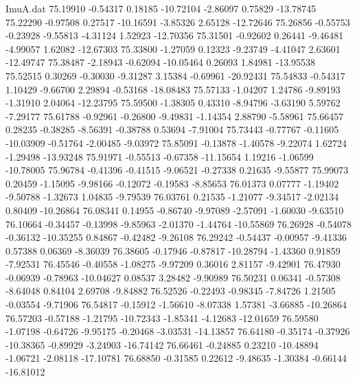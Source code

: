 \begin{filecontents}{ImuA.dat}
  75.19910   -0.54317    0.18185  -10.72104   -2.86097    0.75829  -13.78745
  75.22290   -0.97508    0.27517  -10.16591   -3.85326    2.65128  -12.72646
  75.26856   -0.55753   -0.23928   -9.55813   -4.31124    1.52923  -12.70356
  75.31501   -0.92602    0.26441   -9.46481   -4.99057    1.62082  -12.67303
  75.33800   -1.27059    0.12323   -9.23749   -4.41047    2.63601  -12.49747
  75.38487   -2.18943   -0.62094  -10.05464    0.26093    1.84981  -13.95538
  75.52515    0.30269   -0.30030   -9.31287    3.15384   -0.69961  -20.92431
  75.54833   -0.54317    1.10429   -9.66700    2.29894   -0.53168  -18.08483
  75.57133   -1.04207    1.24786   -9.89193   -1.31910    2.04064  -12.23795
  75.59500   -1.38305    0.43310   -8.94796   -3.63190    5.59762   -7.29177
  75.61788   -0.92961   -0.26800   -9.49831   -1.14354    2.88790   -5.58961
  75.66457    0.28235   -0.38285   -8.56391   -0.38788    0.53694   -7.91004
  75.73443   -0.77767   -0.11605  -10.03909   -0.51764   -2.00485   -9.03972
  75.85091   -0.13878   -1.40578   -9.22074    1.62724   -1.29498  -13.93248
  75.91971   -0.55513   -0.67358  -11.15654    1.19216   -1.06599  -10.78005
  75.96784   -0.41396   -0.41515   -9.06521   -0.27338    0.21635   -9.55877
  75.99073    0.20459   -1.15095   -9.98166   -0.12072   -0.19583   -8.85653
  76.01373    0.07777   -1.19402   -9.50788   -1.32673    1.04835   -9.79539
  76.03761    0.21535   -1.21077   -9.34517   -2.02134    0.80409  -10.26864
  76.08341    0.14955   -0.86740   -9.97089   -2.57091   -1.60030   -9.63510
  76.10664   -0.34457   -0.13998   -9.85963   -2.01370   -1.44764  -10.55869
  76.26928   -0.54078   -0.36132  -10.35255    0.84867   -0.42482   -9.26108
  76.29242   -0.54437   -0.00957   -9.41336    0.57388    0.06369   -8.36039
  76.38605   -0.17946   -0.87817  -10.28794   -1.43360    0.91859   -7.92531
  76.45546   -0.40558   -1.08275   -9.97209    0.36016    2.81157   -9.42901
  76.47930   -0.06939   -0.78963  -10.04627    0.08537    3.28482   -9.90989
  76.50231    0.06341   -0.57308   -8.64048    0.84104    2.69708   -9.84882
  76.52526   -0.22493   -0.98345   -7.84726    1.21505   -0.03554   -9.71906
  76.54817   -0.15912   -1.56610   -8.07338    1.57381   -3.66885  -10.26864
  76.57203   -0.57188   -1.21795  -10.72343   -1.85341   -4.12683  -12.01659
  76.59580   -1.07198   -0.64726   -9.95175   -0.20468   -3.03531  -14.13857
  76.64180   -0.35174   -0.37926  -10.38365   -0.89929   -3.24903  -16.74142
  76.66461   -0.24885    0.23210  -10.48894   -1.06721   -2.08118  -17.10781
  76.68850   -0.31585    0.22612   -9.48635   -1.30384   -0.66144  -16.81012

\end{filecontents}
